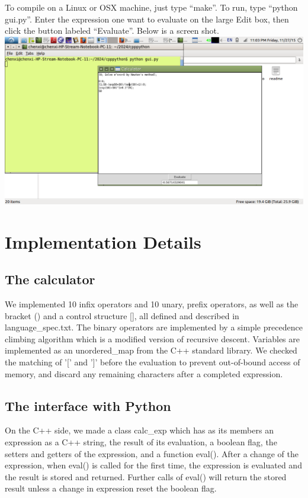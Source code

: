 \documentclass[]{article}
\begin{document}
To compile on a Linux or OSX machine, just type ``make''. To run, type ``python gui.py''. Enter the expression one want to evaluate on the large Edit box, then click the button labeled ``Evaluate''. Below is a screen shot.\\

\includegraphics[scale=0.25]{screenshot.png}

\section{Implementation Details}
\subsection{The calculator}
We implemented 10 infix operators and 10 unary, prefix operators, as well as the bracket () and a control structure [], all defined and described in language\_spec.txt. The binary operators are implemented by a simple precedence climbing algorithm which is a modified version of recursive descent. Variables are implemented as an unordered\_map from the C++ standard library. We checked the matching of '[' and ']' before the evaluation to prevent out-of-bound access of memory, and discard any remaining characters after a completed expression.

\subsection{The interface with Python}
On the C++ side, we made a class calc\_exp which has as its members an expression as a C++ string, the result of its evaluation, a boolean flag, the setters and getters of the expression, and a function eval(). After a change of the expression, when eval() is called for the first time, the expression is evaluated and the result is stored and returned. Further calls of eval() will return the stored result unless a change in expression reset the boolean flag.\\
\end{document}
